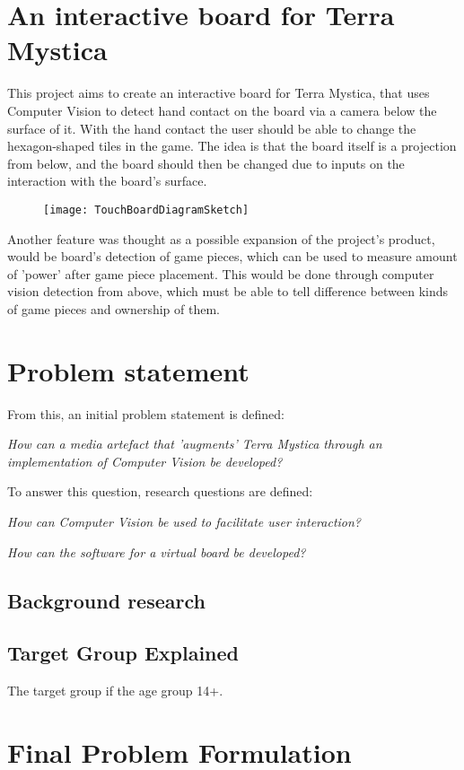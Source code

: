 \section{An interactive board for Terra Mystica}
This project aims to create an interactive board for Terra Mystica, that uses Computer Vision to detect hand contact on the board via a camera below the surface of it. With the hand contact the user should be able to change the hexagon-shaped tiles in the game. The idea is that the board itself is a projection from below, and the board should then be changed due to inputs on the interaction with the board's surface. 

\begin{figure}[!h]
\centering	\texttt{[image: TouchBoardDiagramSketch]}
\end{figure}

Another feature was thought as a possible expansion of the project's product, would be board's detection of game pieces, which can be used to measure amount of 'power' after game piece placement. This would be done through computer vision detection from above, which must be able to tell difference between kinds of game pieces and ownership of them.

\section{Problem statement}
From this, an initial problem statement is defined: 

\textit{How can a media artefact that 'augments' Terra Mystica through an implementation of Computer Vision be developed?}

To answer this question, research questions are defined:

\textit{How can Computer Vision be used to facilitate user interaction?}

\textit{How can the software for a virtual board be developed?}

\subsection{Background research}




\subsection{Target Group Explained}
The target group if the age group 14+.

\section{Final Problem Formulation}\label{sec:finalprob}

